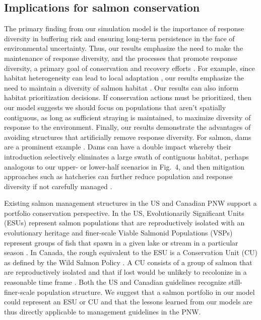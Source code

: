 \subsection{Implications for salmon conservation}

The primary finding from our simulation model is the importance of response diversity in buffering risk and ensuring long-term persistence in the face of environmental uncertainty. Thus, our results emphasize the need to make the maintenance of response diversity, and the processes that promote response diversity, a primary goal of conservation and recovery efforts \citep{moore2010}. For example, since habitat heterogeneity can lead to local adaptation \citep{taylor1991, fraser2011}, our results emphasize the need to maintain a diversity of salmon habitat \citep{rogers2008}. Our results can also inform habitat prioritization decisions. If conservation actions must be prioritized, then our model suggests we should focus on populations that aren't spatially contiguous, as long as sufficient straying is maintained, to maximize diversity of response to the environment. Finally, our results demonstrate the advantages of avoiding structures that artificially remove response diversity. For salmon, dams are a prominent example \citep{waples2007, pess2012}. Dams can have a double impact whereby their introduction selectively eliminates a large swath of contiguous habitat, perhaps analogous to our upper- or lower-half scenarios in Fig.~4, and then mitigation approaches such as hatcheries can further reduce population and response diversity if not carefully managed \citep{waples1991a, mobrand2005}.

Existing salmon management structures in the US and Canadian PNW support a portfolio conservation perspective. In the US, Evolutionarily Significant Units (ESUs) represent salmon populations that are reproductively isolated with an evolutionary heritage \citep{waples1991, moritz1994} and finer-scale Viable Salmonid Populations (VSPs) represent groups of fish that spawn in a given lake or stream in a particular season \citep{mceacheran2000}. In Canada, the rough equivalent to the ESU is a Conservation Unit (CU) as defined by the Wild Salmon Policy \citep{dfo2005wsp}. A CU consists of a group of salmon that are reproductively isolated and that if lost would be unlikely to recolonize in a reasonable time frame \citep{dfo2005wsp}. Both the US and Canadian guidelines recognize still-finer-scale population structure. We suggest that a salmon portfolio in our model could represent an ESU or CU and that the lessons learned from our models are thus directly applicable to management guidelines in the PNW.

